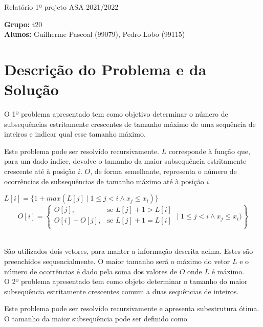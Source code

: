 \documentclass[12pt, letterpaper]{article}
\begin{document}
\begin{center}
	{\LARGE{Relatório 1º projeto ASA 2021/2022}}\\[\baselineskip]
\end{center}

\begin{flushleft}
	\textbf{Grupo:} t20\\
	\textbf{Alunos:} Guilherme Pascoal (99079), Pedro Lobo (99115)
\end{flushleft}


\section{Descrição do Problema e da Solução}

O 1º problema apresentado tem como objetivo determinar o número de subsequências
estritamente crescentes de tamanho máximo de uma sequência de inteiros e indicar
qual esse tamanho máximo.

Este problema pode ser resolvido recursivamente. $L$ corresponde à função que,
para um dado índice, devolve o tamanho da maior subsequência estritamente
crescente até à posição $i$. $O$, de forma semelhante, representa o número de
ocorrências de subsequências de tamanho máximo até à posição $i$.

\begin{center}
	${L[i] = \{1 + max(L[j] \mid 1 \leq j < i \land x_j \leq x_i)}\}$\\
	\[
    O[i] = \left\{\begin{array}{lr}
		O[j], & \text{se } L[j] + 1 > L[i]\\
		O[i] + O[j], & \text{se } L[j] + 1 = L[i]\\
        \end{array} \mid 1 \leq j < i \land x_j \leq x_i)\right\}
	\]\\[\baselineskip]

\end{center}

São utilizados dois vetores, para manter a informação descrita acima. Estes são
preenchidos sequencialmente. O maior tamanho será o máximo do vetor $L$ e o
número de ocorrências é dado pela soma dos valores de $O$ onde $L$ é máximo.\\[\baselineskip]


O 2º problema apresentado tem como objeto determinar o tamanho do maior subsequência
estritamente crescentes comum a duas sequências de inteiros.

Este problema pode ser resolvido recursivamente e apresenta subestrutura ótima.
O tamanho da maior subsequência pode ser definido como
\end{document}
